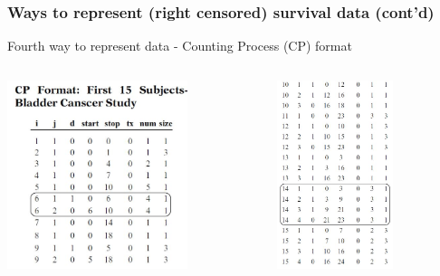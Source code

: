 \documentclass{beamer}
\theoremstyle{definition}
\begin{document}
\begin{frame}
\frametitle{Ways to represent (right censored) survival data (cont'd)}
\begin{block}{Fourth way to represent data - Counting Process (CP) format}
\begin{columns}
    \begin{column}{0.48\textwidth}
        \includegraphics[width =\textwidth, height=5.5cm]{Ch1-CPFormat_1.JPG}
    \end{column}
    \hspace{-10pt}
    \begin{column}{0.48\textwidth}
         \includegraphics[width =\textwidth, height=5.5cm]{Ch1-CPFormat_2.JPG}
    \end{column}
\end{columns}
\end{block}
\end{frame} 
\end{document}
